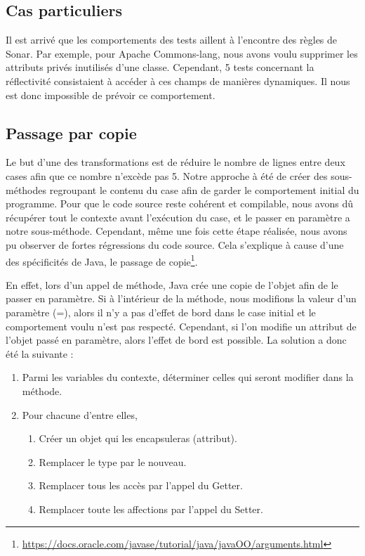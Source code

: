 \documentclass[a4paper]{article}
\begin{document}
\subsection{Cas particuliers}
\par Il est arrivé que les comportements des tests aillent à l'encontre des règles de Sonar. Par exemple, pour Apache Commons-lang, nous avons voulu supprimer les attributs privés inutilisés d'une classe. Cependant, 5 tests concernant la réflectivité consistaient à accéder à ces champs de manières dynamiques. Il nous est donc impossible de prévoir ce comportement.

\subsection{Passage par copie}
\par Le but d'une des transformations est de réduire le nombre de lignes entre deux cases afin que ce nombre n'excède pas 5. Notre approche à été de créer des sous-méthodes regroupant le contenu du case afin de garder le comportement initial du programme. Pour que le code source reste cohérent et compilable, nous avons dû récupérer tout le contexte avant l'exécution du case, et le passer en paramètre a notre sous-méthode. Cependant, même une fois cette étape réalisée, nous avons pu observer de fortes régressions du code source. Cela s'explique à cause d'une des spécificités de Java, le passage de copie\footnote{\url{https://docs.oracle.com/javase/tutorial/java/javaOO/arguments.html}}.
\\
\par 
En effet, lors d'un appel de méthode, Java crée une copie de l'objet afin de le passer en paramètre. Si à l'intérieur de la méthode, nous modifions la valeur d'un paramètre (=), alors il n'y a pas d'effet de bord dans le case initial et le comportement voulu n'est pas respecté. Cependant, si l'on modifie un attribut de l'objet passé en paramètre, alors l'effet de bord est possible. La solution a donc été la suivante :

\begin{enumerate}
	\item Parmi les variables du contexte, déterminer celles qui seront modifier dans la méthode.
	\item Pour chacune d'entre elles, 
	\begin{enumerate}
	\item Créer un objet qui les encapsuleras (attribut).
	\item Remplacer le type par le nouveau.
	\item Remplacer tous les accès par l'appel du Getter.
	\item Remplacer toute les affections par l'appel du Setter.
	\end{enumerate}
	
\end{enumerate}	
\end{document}
